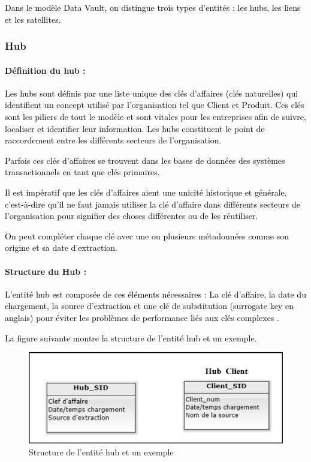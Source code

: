 \documentclass[a4paper,12pt]{report}
\begin{document}
\textcolor{black}{Dans le modèle Data Vault, on distingue trois types d’entités : les hubs, les liens et les satellites.}

\subsubsection{	Hub  }

\paragraph{	Définition du hub :}

\textcolor{black}{Les hubs sont définis par une liste unique des clés d’affaires (clés naturelles) qui identifient un concept utilisé par l’organisation tel que Client et Produit. Ces clés sont les piliers de tout le modèle et sont vitales pour les entreprises afin de suivre, localiser et identifier leur information. Les hubs constituent le point de raccordement entre les différents secteurs de l’organisation\citep{awel2014}.}

\textcolor{black}{Parfois ces clés d’affaires se trouvent dans les bases de données des systèmes transactionnels en tant que clés primaires.}

\textcolor{black}{Il est impératif que les clés d’affaires aient une unicité historique et générale, c’est-à-dire qu’il ne faut jamais utiliser la clé d’affaire dans différents secteurs de l’organisation pour signifier des choses différentes ou de les réutiliser\citep{qosqo12}.}

\textcolor{black}{On peut compléter chaque clé avec une ou plusieurs métadonnées comme son origine et sa date d'extraction.}

\paragraph{Structure du Hub :}

\textcolor{black}{L’entité hub est composée de ces éléments nécessaires : La clé d’affaire, la date du chargement, la source d’extraction et une clé de substitution (surrogate key en anglais) pour éviter les problèmes de performance liés aux clés complexes \citep{awel2014}.}

\textcolor{black}{La figure suivante montre la structure de l’entité hub et un exemple.}

\begin{figure}[H]
\begin{center}
\includegraphics[width=0.7\linewidth]{./images/19}
\end{center}

\caption{Structure de l’entité hub et un exemple \citep{7}}
\label{fig:19}

\end{figure}
\end{document}
